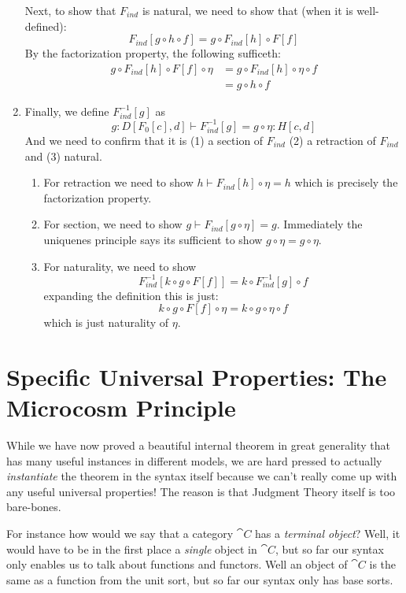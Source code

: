 \documentclass{article}
\begin{document}
\begin{construction}
\begin{enumerate}
    Next, to show that $F_{ind}$ is natural, we need to show that
    (when it is well-defined):
    \[F_{ind}[g \circ h \circ f] = g \circ F_{ind}[h] \circ F[f] \]
    By the factorization property, the following sufficeth:
    \begin{align*}
     g \circ F_{ind}[h] \circ F[f] \circ \eta
     &= g \circ F_{ind}[h] \circ \eta \circ f \tag{naturality of $\eta$}\\
     &= g \circ h \circ f \tag{factorization}
    \end{align*}
  \item Finally, we define $F_{ind}^{-1}[g]$ as
    \[ g : D[F_0[c],d] \vdash F_{ind}^{-1}[g] = g \circ \eta : H[c,d] \]
    And we need to confirm that it is (1) a section of $F_{ind}$ (2) a
    retraction of $F_{ind}$ and (3) natural.
    \begin{enumerate}
    \item For retraction we need to show $h \vdash F_{ind}[h] \circ
      \eta = h$ which is precisely the factorization property.
    \item For section, we need to show $g \vdash F_{ind}[g \circ \eta]
      = g$. Immediately the uniquenes principle says its sufficient to
      show $g \circ \eta = g \circ \eta$.
    \item For naturality, we need to show
      \[ F_{ind}^{-1}[k \circ g \circ F[f]] = k \circ F_{ind}^{-1}[g] \circ f \]
      expanding the definition this is just:
      \[ k \circ g \circ F[f] \circ \eta = k \circ g \circ \eta \circ f \]
      which is just naturality of $\eta$.
    \end{enumerate}
  \end{enumerate}
\end{construction}

\section{Specific Universal Properties: The Microcosm Principle}

While we have now proved a beautiful internal theorem in great
generality that has many useful instances in different models, we are
hard pressed to actually \emph{instantiate} the theorem in the syntax
itself because we can't really come up with any useful universal properties!
The reason is that Judgment Theory itself is too bare-bones.

For instance how would we say that a category $\cat C$ has a
\emph{terminal object}? Well, it would have to be in the first place a
\emph{single} object in $\cat C$, but so far our syntax only enables
us to talk about functions and functors. Well an object of $\cat C$ is
the same as a function from the unit sort, but so far our syntax only
has base sorts.
\end{document}

